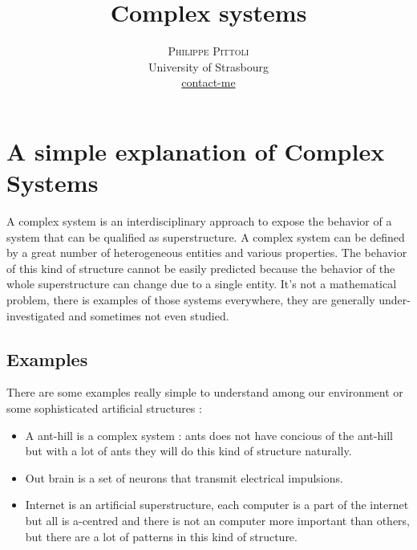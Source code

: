 \documentclass[twoside]{article}
\title{\vspace{-15mm}\fontsize{24pt}{10pt}\selectfont\textbf{Complex systems}} %
\author{
\large
\textsc{Philippe Pittoli}\\[2mm] %
\normalsize University of Strasbourg \\ %
\normalsize \href{mailto:philippe.pittoli@etu.unistra.fr}{contact-me} %
\vspace{-5mm}
}
\date{}
\begin{document}
\maketitle %

\thispagestyle{fancy} %



\section{A simple explanation of Complex Systems}



A complex system is an interdisciplinary approach to expose the behavior of a system that can be qualified as superstructure.
A complex system can be defined by a great number of heterogeneous entities and various properties.
The behavior of this kind of structure cannot be easily predicted because the behavior of the whole superstructure can change due to a single entity.
It's not a mathematical problem, there is examples of those systems everywhere, they are generally under-investigated and sometimes not even studied.

\subsection{Examples}
There are some examples really simple to understand among our environment or some sophisticated artificial structures :
\begin{itemize}
\item A ant-hill is a complex system : ants does not have concious of the ant-hill but with a lot of ants they will do this kind of structure naturally.
\item Out brain is a set of neurons that transmit electrical impulsions.
\item Internet is an artificial superstructure, each computer is a part of the internet but all is a-centred and there is not an computer more important than others, but there are a lot of patterns in this kind of structure.
\end{itemize}
\end{document}
